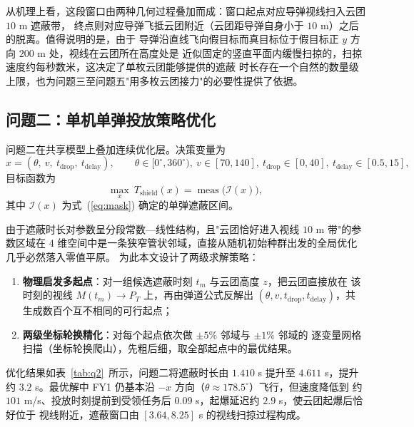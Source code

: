 \documentclass[12pt, a4paper]{article}
\begin{document}
从机理上看，这段窗口由两种几何过程叠加而成：窗口起点对应导弹视线扫入云团 $10$ m 遮蔽带，
终点则对应导弹飞抵云团附近（云团距导弹自身小于 $10$ m）之后的脱离。值得说明的是，由于
导弹沿直线飞向假目标而真目标位于假目标正 $y$ 方向 $200$ m 处，视线在云团所在高度处是
近似固定的竖直平面内缓慢扫掠的，扫掠速度约每秒数米，这决定了单枚云团能够提供的遮蔽
时长存在一个自然的数量级上限，也为问题三至问题五"用多枚云团接力"的必要性提供了依据。

\subsection{问题二：单机单弹投放策略优化}

问题二在共享模型上叠加连续优化层。决策变量为
\begin{equation}
    x = (\theta,\ v,\ t_{\mathrm{drop}},\ t_{\mathrm{delay}}),
    \qquad \theta\in[0^{\circ},360^{\circ}),\ v\in[70,140],\ t_{\mathrm{drop}}\in[0,40],\
    t_{\mathrm{delay}}\in[0.5,15],
    \label{eq:q2var}
\end{equation}
目标函数为
\begin{equation}
    \max_{x}\ T_{\mathrm{shield}}(x) = \operatorname{meas}\!\big(\mathcal{I}(x)\big),
    \label{eq:q2obj}
\end{equation}
其中 $\mathcal{I}(x)$ 为式~(\ref{eq:mask}) 确定的单弹遮蔽区间。

由于遮蔽时长对参数呈分段常数—线性结构，且"云团恰好进入视线 $10$ m 带"的参数区域在
4 维空间中是一条狭窄管状邻域，直接从随机初始种群出发的全局优化几乎必然落入零值平原。
为此本文设计了两级求解策略：
\begin{enumerate}[label=\textbf{Step \arabic*：}, leftmargin=*]
    \item \textbf{物理启发多起点}：对一组候选遮蔽时刻 $t_m$ 与云团高度 $z$，把云团直接放在
          该时刻的视线 $M(t_m)\to P_T$ 上，再由弹道公式反解出 $(\theta,v,t_{\mathrm{drop}},
          t_{\mathrm{delay}})$，共生成数百个互不相同的可行起点；
    \item \textbf{两级坐标轮换精化}：对每个起点依次做 $\pm5\%$ 邻域与 $\pm1\%$ 邻域的
          逐变量网格扫描（坐标轮换爬山），先粗后细，取全部起点中的最优结果。
\end{enumerate}
优化结果如表~\ref{tab:q2}~所示，问题二将遮蔽时长由 $1.410$ s 提升至 $4.611$ s，提升约
$3.2$ s。最优解中 FY1 仍基本沿 $-\!x$ 方向（$\theta\approx178.5^{\circ}$）飞行，但速度降低到
约 $101$ m/s、投放时刻提前到受领任务后 $0.09$ s，起爆延迟约 $2.9$ s，使云团起爆后恰好位于
视线附近，遮蔽窗口由 $[3.64,8.25]$ s 的视线扫掠过程构成。
\end{document}
